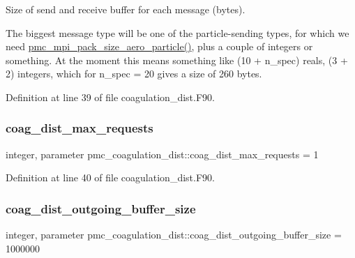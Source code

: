 Size of send and receive buffer for each message (bytes). 

The biggest message type will be one of the particle-\/sending types, for which we need \mbox{\hyperlink{namespacepmc__aero__particle_a1f0365c14bb9b38724842c598cb152ed}{pmc\+\_\+mpi\+\_\+pack\+\_\+size\+\_\+aero\+\_\+particle()}}, plus a couple of integers or something. At the moment this means something like (10 + n\+\_\+spec) reals, (3 + 2) integers, which for n\+\_\+spec = 20 gives a size of 260 bytes. 

Definition at line 39 of file coagulation\+\_\+dist.\+F90.

\mbox{\label{namespacepmc__coagulation__dist_ad7130affac816ec06993cec78d709373}} 
\subsubsection{\texorpdfstring{coag\+\_\+dist\+\_\+max\+\_\+requests}{coag\_dist\_max\_requests}}
{\footnotesize\ttfamily integer, parameter pmc\+\_\+coagulation\+\_\+dist\+::coag\+\_\+dist\+\_\+max\+\_\+requests = 1}



Definition at line 40 of file coagulation\+\_\+dist.\+F90.

\mbox{\label{namespacepmc__coagulation__dist_abb819d699f6444884920ff2d74ec6029}} 
\subsubsection{\texorpdfstring{coag\+\_\+dist\+\_\+outgoing\+\_\+buffer\+\_\+size}{coag\_dist\_outgoing\_buffer\_size}}
{\footnotesize\ttfamily integer, parameter pmc\+\_\+coagulation\+\_\+dist\+::coag\+\_\+dist\+\_\+outgoing\+\_\+buffer\+\_\+size = 1000000}



